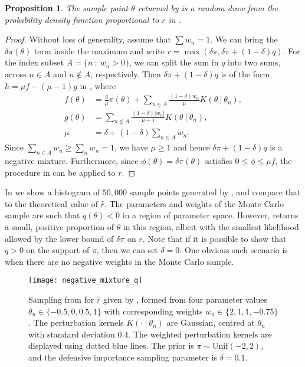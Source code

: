 \documentclass[12pt, onecolumn]{article}
\newtheorem{proposition}[theorem]{Proposition}
\begin{document}
\begin{proposition}
The sample point $\theta$ returned by  is a random draw from the probability density function proportional to $r$ in .
\end{proposition}
\begin{proof}
Without loss of generality, assume that $\sum w_n = 1$.
We can bring the $\delta \pi(\theta)$ term inside the maximum and write $r = \max(\delta \pi, \delta \pi + (1-\delta) q)$.
For the index subset $A = \{ n~:~w_n>0 \}$, we can split the sum in $q$ into two sums, across $n \in A$ and $n \notin A$, respectively.
Then $\delta \pi + (1-\delta) q$ is of the form $h = \mu f - (\mu - 1) g$ in , where
\begin{align*}
f(\theta) &= \frac{\delta}{\mu} \pi(\theta) + \sum_{n \in A} \frac{(1-\delta) w_n}{\mu} K(\theta~|~\theta_n),
\\
g(\theta) &= \sum_{n \notin A} \frac{(1-\delta)\left|w_n\right|}{\mu - 1} K(\theta~|~\theta_n),
\\
\mu &= \delta + (1-\delta) \sum_{n \in A} w_n.
\end{align*}
Since $\sum_{n \in A} w_n \geq \sum_n w_n = 1$, we have $\mu \geq 1$ and hence $\delta \pi + (1-\delta) q$ is a negative mixture.
Furthermore, since $\phi(\theta) = \delta \pi(\theta)$ satisfies $0 \leq \phi\leq \mu f$, the procedure in  can be applied to $r$.
\end{proof}

In  we show a histogram of $50,000$ sample points generated by , and compare that to the theoretical value of $\hat r$.
The parameters and weights of the Monte Carlo sample are such that $q(\theta) < 0$ in a region of parameter space. 
However,  returns a small, positive proportion of $\theta$ in this region, albeit with the smallest likelihood allowed by the lower bound of $\delta \pi$ on $r$.
Note that if it is possible to show that $q>0$ on the support of $\pi$, then we can set $\delta=0$.
One obvious such scenario is when there are no negative weights in the Monte Carlo sample.

\begin{figure}
\centering
\texttt{[image: negative\_mixture\_q]}
\caption{
Sampling from  for $\hat r$ given by , formed from four parameter values $\theta_n \in \{-0.5, 0, 0.5, 1\}$ with corresponding weights $w_n \in \{2, 1, 1, -0.75\}$. 
The perturbation kernels $K(\cdot~|~\theta_n)$ are Gaussian, centred at $\theta_n$ with standard deviation $0.4$.
The weighted perturbation kernels are displayed using dotted blue lines. 
The prior is $\pi \sim \mathrm{Unif}(-2, 2)$, and the defensive importance sampling parameter is $\delta = 0.1$.
}
\label{fig:negative_mixture_q}
\end{figure}
\end{document}
